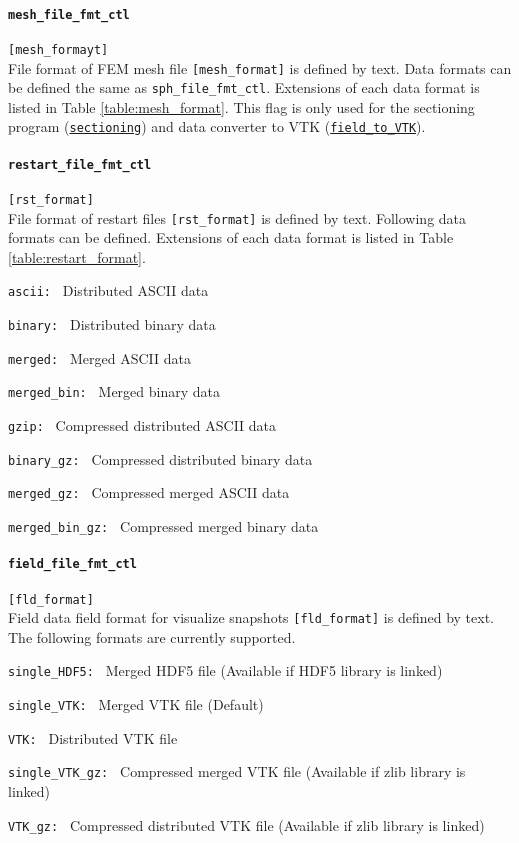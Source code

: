 \paragraph{\tt mesh\_file\_fmt\_ctl}
\label{href_t:mesh_file_fmt_ctl}
\verb|[mesh_formayt]| \\
File format of FEM mesh file \verb|[mesh_format]| is defined by text. Data formats can be defined the same as {\tt sph\_file\_fmt\_ctl}. Extensions of each data format is listed in Table \ref{table:mesh_format}. This flag is only used for the sectioning program (\hyperref[sec:sectioning]{\tt sectioning}) and data converter to VTK (\hyperref[sec:field_to_VTK]{\tt field\_to\_VTK}).

\paragraph{\tt restart\_file\_fmt\_ctl}
\label{href_t:restart_file_fmt_ctl}
\verb|[rst_format]| \\
File format of restart files \verb|[rst_format]| is defined by text. Following data formats can be defined. Extensions of each data format is listed in Table \ref{table:restart_format}.
%
\begin{description}
\item{\tt ascii: }   Distributed ASCII data
\item{\tt binary: }  Distributed binary data
\item{\tt merged: }  Merged ASCII data
\item{\tt merged\_bin: }   Merged binary data
\item{\tt gzip: }            Compressed distributed ASCII data
\item{\tt binary\_gz: }      Compressed distributed binary data
\item{\tt merged\_gz: }      Compressed merged ASCII data
\item{\tt merged\_bin\_gz: } Compressed merged binary data
\end{description}
%

\paragraph{\tt field\_file\_fmt\_ctl}
\label{href_t:field_file_fmt_ctl}
\verb|[fld_format]| \\
Field data field format for visualize snapshots \verb|[fld_format]| is defined by text. The following formats are currently supported.
%
\begin{description}
\item{\tt single\_HDF5: }  Merged HDF5 file (Available if HDF5 library is linked)
\item{\tt single\_VTK: }   Merged VTK file (Default)
\item{\tt VTK: }           Distributed VTK file
\item{\tt single\_VTK\_gz: }   Compressed merged VTK file (Available if zlib library is linked)
\item{\tt VTK\_gz: }           Compressed distributed VTK file (Available if zlib library is linked)
\end{description}
%
%
%
%

